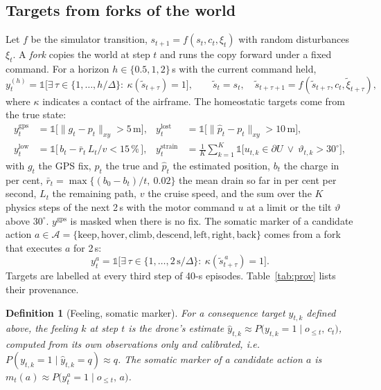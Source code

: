 \documentclass[10pt]{article}
\newtheorem{definition}{Definition}
\begin{document}
\subsection{Targets from forks of the world}
Let $f$ be the simulator transition, $s_{t+1}=f(s_t,c_t,\xi_t)$ with random disturbances $\xi_t$. A \emph{fork} copies the world at
step $t$ and runs the copy forward under a fixed command. For a horizon $h\in\{0.5,1,2\}$\,s with the current command held,
\begin{equation}
y^{(h)}_t=\mathbb{1}\Big[\exists\,\tau\in\{1,\dots,h/\Delta\}:\ \kappa(\tilde s_{t+\tau})=1\Big],\qquad
\tilde s_t=s_t,\quad \tilde s_{t+\tau+1}=f(\tilde s_{t+\tau},c_t,\tilde\xi_{t+\tau}),
\end{equation}
where $\kappa$ indicates a contact of the airframe. The homeostatic targets come from the true state:
\begin{align}
y^{\mathrm{gps}}_t&=\mathbb{1}\big[\lVert g_t-p_t\rVert_{xy}>5\,\mathrm{m}\big], &
y^{\mathrm{lost}}_t&=\mathbb{1}\big[\lVert \hat p_t-p_t\rVert_{xy}>10\,\mathrm{m}\big],\\
y^{\mathrm{low}}_t&=\mathbb{1}\big[\,b_t-\bar r_t\,L_t/v<15\,\%\,\big], &
y^{\mathrm{strain}}_t&=\frac{1}{K}\sum_{k=1}^{K}\mathbb{1}\big[u_{t,k}\in\partial U\ \lor\ \vartheta_{t,k}>30^\circ\big],
\end{align}
with $g_t$ the GPS fix, $p_t$ the true and $\hat p_t$ the estimated position, $b_t$ the charge in per cent,
$\bar r_t=\max\{(b_0-b_t)/t,\ 0.02\}$ the mean drain so far in per cent per second, $L_t$ the remaining path, $v$ the cruise speed,
and the sum over the $K$ physics steps of the next 2\,s with the motor command $u$ at a limit or the tilt $\vartheta$ above
$30^\circ$. $y^{\mathrm{gps}}$ is masked when there is no fix. The somatic marker of a candidate action
$a\in\mathcal A=\{\text{keep},\text{hover},\text{climb},\text{descend},\text{left},\text{right},\text{back}\}$ comes from a fork that
executes $a$ for 2\,s:
\begin{equation}
y^{a}_t=\mathbb{1}\Big[\exists\,\tau\in\{1,\dots,2\,\mathrm{s}/\Delta\}:\ \kappa(\tilde s^{\,a}_{t+\tau})=1\Big].
\end{equation}
Targets are labelled at every third step of 40-s episodes. Table~\ref{tab:prov} lists their provenance.

\begin{definition}[Feeling, somatic marker]\label{def:feeling}
For a consequence target $y_{t,k}$ defined above, the feeling $k$ at step $t$ is the drone's estimate
$\hat y_{t,k}\approx P\big(y_{t,k}=1\mid o_{\le t},\,c_t\big)$, computed from its own observations only and calibrated, i.e.\
$P(y_{t,k}=1\mid\hat y_{t,k}=q)\approx q$. The somatic marker of a candidate action $a$ is
$m_t(a)\approx P\big(y^{a}_t=1\mid o_{\le t},\,a\big)$.
\end{definition}
\end{document}

